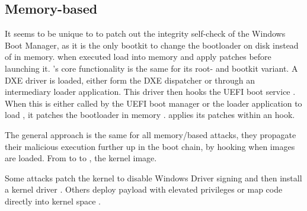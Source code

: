 \subsection{Memory-based}

It seems to be unique to \cite{especter} to patch out the integrity self-check of the Windows Boot Manager, as it is the only bootkit to change the bootloader on disk instead of in memory.
\cite{finspy, dreamboot} when executed load  into memory and apply patches before launching it.
\cite{efiguard}'s core functionality is the same for its root- and bootkit variant.
A \ac{DXE} driver is loaded, either form the \ac{DXE} dispatcher or through an intermediary loader application.
This driver then hooks the \ac{UEFI} boot service . When this is either called by the \ac{UEFI} boot manager or the loader application to load , it patches the bootloader in memory \cite{efiguard}. \cite{moonbounce} applies its patches within an  hook.

The general approach is the same for all memory\-/based attacks, they propagate their malicious execution further up in the boot chain, by hooking when images are loaded. From  to  to , the kernel image.

Some attacks patch the kernel to disable Windows Driver signing and then install a kernel driver \cite{efiguard,especter}.
Others deploy payload with elevated privileges \cite{finspy, dreamboot} or map code directly into kernel space \cite{moonbounce,cosmicstrand}.